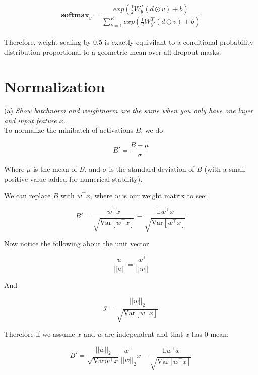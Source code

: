 \documentclass{amsart}
\theoremstyle{definition}
\theoremstyle{remark}
\numberwithin{equation}{section}
\begin{document}
\begin{equation}
\mathbf{softmax}_y = \frac{exp \left( \frac{1}{2}W_y^T(d \odot v) + b \right)}
                          {\sum_{k=1}^K exp \left( \frac{1}{2}W_{y'}^T(d \odot v) + b \right)}
\end{equation} \\

Therefore, weight scaling by 0.5 is exactly equivilant to a conditional
probability distribution proportional to a geometric mean over all dropout masks.

\section{Normalization}

(a) \textit{Show batchnorm and weightnorm are the same when you only have one
layer and input feature $x$.}\\

To normalize the minibatch of activations $B$, we do

\begin{equation}
B' = \frac{B - \mu}{\sigma}
\end{equation}

Where $\mu$ is the mean of $B$, and $\sigma$ is the standard deviation of $B$
(with a small positive value added for numerical stability).

We can replace $B$ with $w^\top x$, where $w$ is our weight matrix to see:

\begin{equation}
B' = \frac{w^\top x}{\sqrt{\mathrm{Var}[w^\top x]}} -
     \frac{\mathbb{E}w^\top x}{\sqrt{\mathrm{Var}[w^\top x]}}
\end{equation}

Now notice the following about the unit vector

\begin{equation}
\frac{u}{||u||} = \frac{w^\top}{||w||}
\end{equation}

And

\begin{equation}
g=\frac{||w||_2}{\sqrt{\mathrm{Var}[w^{\top}x]}}
\end{equation}

Therefore if we assume $x$ and $w$ are independent and that $x$ has 0 mean:

\begin{equation}
B' = \frac{||w||_2}{\sqrt{\mathrm{Var}w^{\top}x}} \frac{w^\top}{||w||_2}x -
     \frac{\mathbb{E}w^\top x}{\sqrt{\mathrm{Var}[w^{\top}x]}}
\end{equation}
\end{document}
